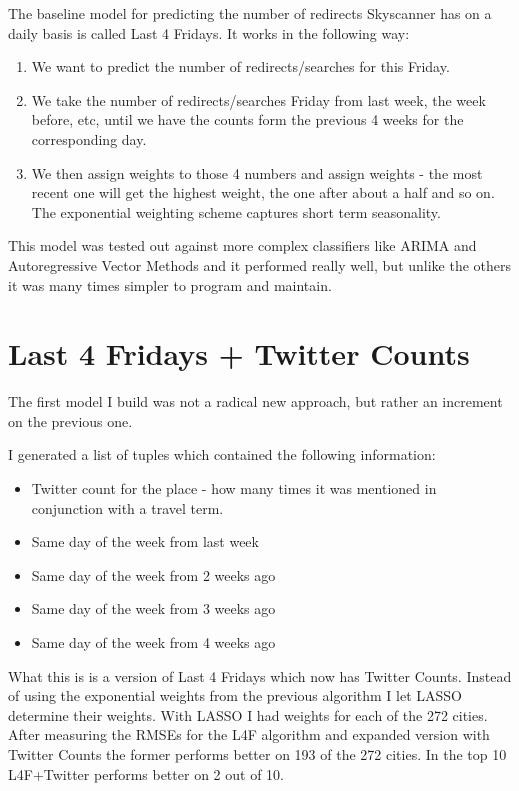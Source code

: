 \documentclass[minf,frontabs,twoside,singlespacing,parskip]{infthesis}
\begin{document}
The baseline model for predicting the number of redirects Skyscanner has on a daily basis is called Last 4 Fridays. 
It works in the following way:
\begin{enumerate}
\item We want to predict the number of redirects/searches for this Friday.
\item We take the number of redirects/searches Friday from last week, the week before, etc, until we have the counts form the previous 4 weeks for the corresponding day.
\item We then assign weights to those 4 numbers and assign weights - the most recent one will get the highest weight, the one after about a half and so on. The exponential weighting scheme captures short term seasonality.
\end{enumerate}

This model was tested out against more complex classifiers like ARIMA and Autoregressive Vector Methods and it performed really well, but unlike the others it was many times simpler to program and maintain.

\section{Last 4 Fridays + Twitter Counts}

The first model I build was not a radical new approach, but rather an increment on the previous one.

I generated a list of tuples which contained the following information:
\begin{itemize}
\item Twitter count for the place - how many times it was mentioned in conjunction with a travel term.
\item Same day of the week from last week
\item Same day of the week from 2 weeks ago
\item Same day of the week from 3 weeks ago
\item Same day of the week from 4 weeks ago
\end{itemize}

What this is is a version of Last 4 Fridays which now has Twitter Counts. Instead of using the exponential weights from the previous algorithm I let LASSO determine their weights.
With LASSO I had weights for each of the 272 cities. After measuring the RMSEs for the L4F algorithm and expanded version with Twitter Counts the former performs better on 193 of the 272 cities. In the top 10 L4F+Twitter performs better on 2 out of 10. 
\end{document}
